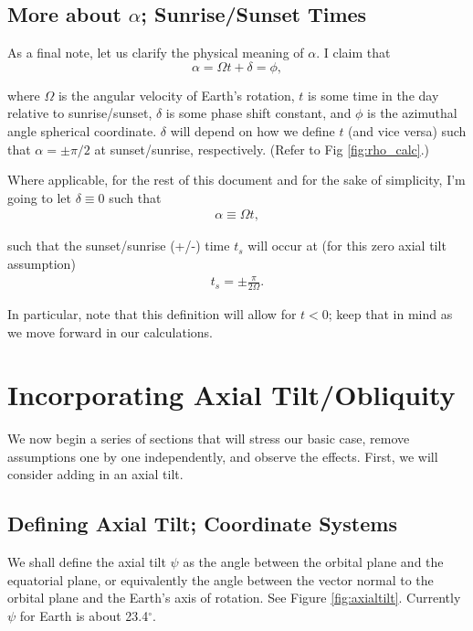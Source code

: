 \documentclass[10pt]{article}
\begin{document}
\subsection{More about $\alpha$; Sunrise/Sunset Times}
\label{subsec:sunsetrise}

As a final note, let us clarify the physical meaning of $\alpha$. I claim that
$$
\alpha = \Omega t + \delta = \phi,
$$

where $\Omega$ is the angular velocity of Earth's rotation, $t$ is some time in the day relative to sunrise/sunset, $\delta$ is some phase shift constant, and $\phi$ is the azimuthal angle spherical coordinate. $\delta$ will depend on how we define $t$ (and vice versa) such that $\alpha = \pm \pi/2$ at sunset/sunrise, respectively. (Refer to Fig \ref{fig:rho_calc}.)

\vspace{10pt} Where applicable, for the rest of this document and for the sake of simplicity, I'm going to let $\delta \equiv 0$ such that 
\begin{align} \label{eq:alpha_def}
\alpha \equiv \Omega t,
\end{align}

such that the sunset/sunrise (+/-) time $t_s$ will occur at (for this zero axial tilt assumption)
\begin{align}
t_s = \pm \frac{\pi}{2 \Omega}.
\end{align}

In particular, note that this definition will allow for $t < 0$; keep that in mind as we move forward in our calculations.

\section{Incorporating Axial Tilt/Obliquity}

We now begin a series of sections that will stress our basic case, remove assumptions one by one independently, and observe the effects. First, we will consider adding in an axial tilt. 

\subsection{Defining Axial Tilt; Coordinate Systems}

We shall define the axial tilt $\psi$ as the angle between the orbital plane and the equatorial plane, or equivalently the angle between the vector normal to the orbital plane and the Earth's axis of rotation. See Figure \ref{fig:axialtilt}. Currently $\psi$ for Earth is about 23.4$^{\circ}$.
\end{document}
